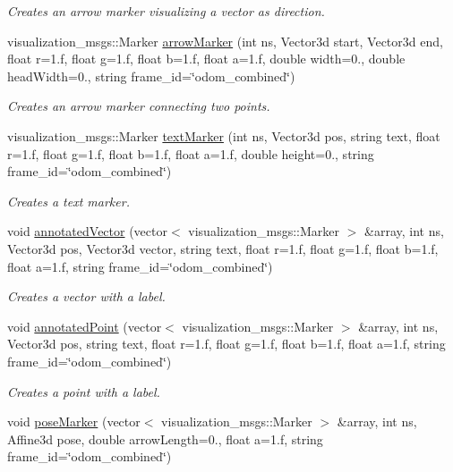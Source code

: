 \begin{DoxyCompactItemize}
\begin{DoxyCompactList}\small\item\em Creates an arrow marker visualizing a vector as direction. \end{DoxyCompactList}\item 
visualization\-\_\-msgs\-::\-Marker \hyperlink{classVisualizationManager_a58d47a4507c3216b906a166c9cc1ba17}{arrow\-Marker} (int ns, Vector3d start, Vector3d end, float r=1.f, float g=1.f, float b=1.f, float a=1.f, double width=0., double head\-Width=0., string frame\-\_\-id=\char`\"{}odom\-\_\-combined\char`\"{})
\begin{DoxyCompactList}\small\item\em Creates an arrow marker connecting two points. \end{DoxyCompactList}\item 
visualization\-\_\-msgs\-::\-Marker \hyperlink{classVisualizationManager_a16a80f780d1ab0b450be70aa14ba09b2}{text\-Marker} (int ns, Vector3d pos, string text, float r=1.f, float g=1.f, float b=1.f, float a=1.f, double height=0., string frame\-\_\-id=\char`\"{}odom\-\_\-combined\char`\"{})
\begin{DoxyCompactList}\small\item\em Creates a text marker. \end{DoxyCompactList}\item 
void \hyperlink{classVisualizationManager_a37a6fc1245fe6ed7f3410792cf41e7ec}{annotated\-Vector} (vector$<$ visualization\-\_\-msgs\-::\-Marker $>$ \&array, int ns, Vector3d pos, Vector3d vector, string text, float r=1.f, float g=1.f, float b=1.f, float a=1.f, string frame\-\_\-id=\char`\"{}odom\-\_\-combined\char`\"{})
\begin{DoxyCompactList}\small\item\em Creates a vector with a label. \end{DoxyCompactList}\item 
void \hyperlink{classVisualizationManager_a9724369385e07346cf0d07dd57d66458}{annotated\-Point} (vector$<$ visualization\-\_\-msgs\-::\-Marker $>$ \&array, int ns, Vector3d pos, string text, float r=1.f, float g=1.f, float b=1.f, float a=1.f, string frame\-\_\-id=\char`\"{}odom\-\_\-combined\char`\"{})
\begin{DoxyCompactList}\small\item\em Creates a point with a label. \end{DoxyCompactList}\item 
void \hyperlink{classVisualizationManager_a9caff4d805416c67cc7fb3250259abe0}{pose\-Marker} (vector$<$ visualization\-\_\-msgs\-::\-Marker $>$ \&array, int ns, Affine3d pose, double arrow\-Length=0., float a=1.f, string frame\-\_\-id=\char`\"{}odom\-\_\-combined\char`\"{})

\end{DoxyCompactItemize}
